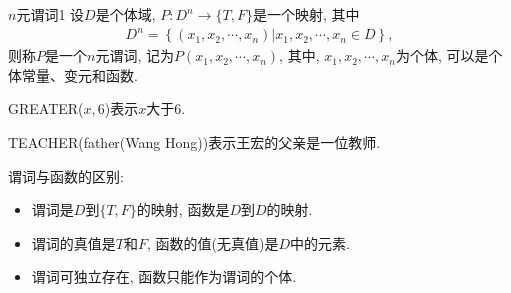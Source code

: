 \begin{mydef}{$n$元谓词}{1}
设$D$是个体域, $P: D^n\rightarrow \{T,F\}$是一个映射, 其中
\begin{align}
    D^{n}=\left\{\left(x_{1}, x_{2}, \cdots, x_{n}\right) | x_{1}, x_{2}, \cdots, x_{n} \in D\right\},
\end{align}
则称$P$是一个$n$元谓词, 记为$P(x_1,x_2,\cdots,x_n)$, 其中, $x_{1}, x_{2}, \cdots, x_{n}$为个体, 可以是个体常量、变元和函数.
\end{mydef}

\begin{example}
GREATER($x,6$)表示$x$大于6.

\quad TEACHER(father(Wang Hong))表示王宏的父亲是一位教师.
\end{example}

谓词与函数的区别:
\begin{itemize}
\item 谓词是$D$到$\{T,F\}$的映射, 函数是$D$到$D$的映射.
\item 谓词的真值是$T$和$F$, 函数的值(无真值)是$D$中的元素.
\item 谓词可独立存在, 函数只能作为谓词的个体.
\end{itemize}
